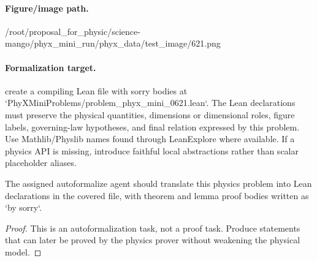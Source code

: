 \paragraph{Figure/image path.}
/root/proposal\_for\_physic/science-mango/phyx\_mini\_run/phyx\_data/test\_image/621.png

\paragraph{Formalization target.}
create a compiling Lean file with sorry bodies at `PhyXMiniProblems/problem\_phyx\_mini\_0621.lean`. The Lean declarations must preserve the physical quantities, dimensions or dimensional roles, figure labels, governing-law hypotheses, and final relation expressed by this problem.
Use Mathlib/Physlib names found through LeanExplore where available. If a physics API is missing, introduce faithful local abstractions rather than scalar placeholder aliases.

\begin{theorem}
\label{thm:physics:phyx_mini_0621:target}
The assigned autoformalize agent should translate this physics problem into Lean declarations in the covered file, with theorem and lemma proof bodies written as `by sorry`.
\end{theorem}
\begin{proof}
This is an autoformalization task, not a proof task. Produce statements that can later be proved by the physics prover without weakening the physical model.
\end{proof}

